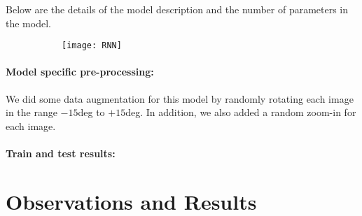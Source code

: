 \documentclass{scrreprt}
\begin{document}
Below are the details of the model description and the number of parameters in the model.
\begin{figure}
\begin{subfigure}{0.5\textwidth}
\texttt{[image: RNN]}
\end{subfigure}
\end{figure}

\subsubsection{Model specific pre-processing:}
We did some data augmentation for this model by randomly rotating each image in the range $-15$deg to $+15$deg. In addition, we also added a random zoom-in for each image.

\subsubsection{Train and test results:}

\chapter{Observations and Results}
\end{document}
